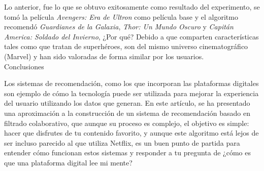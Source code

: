 \documentclass[letterpaper,10pt,final,hyphenatedtitles]{papertexKS}
\begin{document}
\begin{news}{2}
	Lo anterior, fue lo que se obtuvo exitosamente como resultado del experimento, se tomó la película \textit{Avengers: Era de Ultron} como película base y el algoritmo recomendó \textit{Guardianes de la Galaxia}, \textit{Thor: Un Mundo Oscuro} y \textit{Capitán America: Soldado del Invierno}, ¿Por qué? Debido a que comparten características tales como que tratan de superhéroes, son del mismo universo cinematográfico (Marvel) y han sido valoradas de forma similar por los usuarios. 
	\\ 

	\noindent\textcolor{color}{\Large{Conclusiones}}

	Los sistemas de recomendación, como los que incorporan las plataformas digitales son ejemplo de cómo la tecnología puede ser utilizada para mejorar la experiencia del usuario utilizando los datos que generan. En este artículo, se ha presentado una aproximación a la construcción de un sistema de recomendación basado en filtrado colaborativo, que aunque su proceso es complejo, el objetivo es simple: hacer que disfrutes de tu contenido favorito, y aunque este algoritmo está lejos de ser incluso parecido al que utiliza Netflix, es un buen punto de partida para entender cómo funcionan estos sistemas y responder a tu pregunta de ¿cómo es que una plataforma digital lee mi mente?

	\newssep

	
	

\end{news}
\newssep
\noindent
\end{document}
